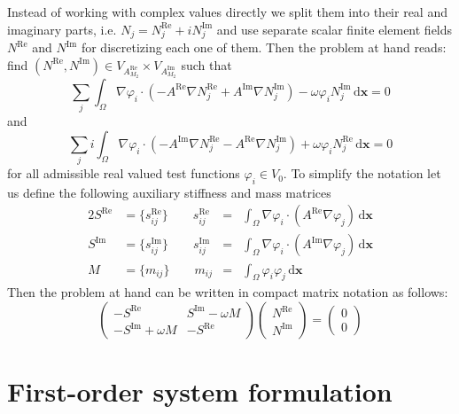\documentclass[11pt,a4paper]{article}
\begin{document}
Instead of working with complex values directly we split them into their real and imaginary parts, i.e. $N_j=N_j^\mathrm{Re}+iN_j^\mathrm{Im}$ and use separate scalar finite element fields $N^\mathrm{Re}$ and $N^\mathrm{Im}$ for discretizing each one of them. Then the problem at hand reads: find $(N^\mathrm{Re},N^\mathrm{Im})\in V_{A_{M_2}^\mathrm{Re}}\times V_{A_{M_2}^\mathrm{Im}}$ such that
\begin{equation}
\sum_j\int_\Omega \nabla\varphi_i\cdot\left(-A^\mathrm{Re}\nabla N_j^\mathrm{Re}+A^\mathrm{Im}\nabla N_j^\mathrm{Im}\right)-\omega \varphi_i N_j^\mathrm{Im}\,\mathrm{d}\mathbf{x}=0
\end{equation}
and
\begin{equation}
\sum_ji\int_\Omega \nabla\varphi_i\cdot\left(-A^\mathrm{Im}\nabla N_j^\mathrm{Re}-A^\mathrm{Re}\nabla N_j^\mathrm{Im}\right)+\omega \varphi_i N_j^\mathrm{Re}\,\mathrm{d}\mathbf{x}=0
\end{equation}
for all admissible real valued test functions $\varphi_i\in V_{0}$.
To simplify the notation let us define the following auxiliary stiffness and mass matrices
\begin{alignat}{2}
S^\mathrm{Re}&=\{s_{ij}^\mathrm{Re}\} \qquad s_{ij}^\mathrm{Re}&=&\int_\Omega \nabla\varphi_i\cdot(A^\mathrm{Re}\nabla\varphi_j)\,\mathrm{d}\mathbf{x}\\
S^\mathrm{Im}&=\{s_{ij}^\mathrm{Im}\} \qquad s_{ij}^\mathrm{Im}&=&\int_\Omega \nabla\varphi_i\cdot(A^\mathrm{Im}\nabla\varphi_j)\,\mathrm{d}\mathbf{x}\\
M&=\{m_{ij}\} \qquad m_{ij}&=&\int_\Omega \varphi_i\varphi_j\,\mathrm{d}\mathbf{x}
\end{alignat}
Then the problem at hand can be written in compact matrix notation as follows:
\begin{equation}
\begin{pmatrix}
-S^\mathrm{Re} & S^\mathrm{Im}-\omega M\\
-S^\mathrm{Im}+\omega M &  -S^\mathrm{Re}
\end{pmatrix}
\begin{pmatrix}
N^\mathrm{Re}\\
N^\mathrm{Im}
\end{pmatrix}
=
\begin{pmatrix}
0\\
0
\end{pmatrix}
\end{equation}

\section{First-order system formulation}
\end{document}
